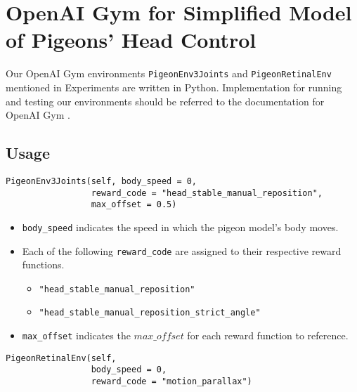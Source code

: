 \section{OpenAI Gym for Simplified Model of Pigeons' Head Control}
Our OpenAI Gym \cite{brockman2016openai} environments \lstinline|PigeonEnv3Joints| and \lstinline|PigeonRetinalEnv| mentioned in Experiments are written in Python. Implementation for running and testing our environments should be referred to the documentation for OpenAI Gym \cite{openai_2016}.

\subsection{Usage}
\begin{lstlisting}
PigeonEnv3Joints(self, body_speed = 0,
                 reward_code = "head_stable_manual_reposition",
                 max_offset = 0.5)
\end{lstlisting}
\begin{itemize}
    \item \lstinline|body_speed| indicates the speed in which the pigeon model's body moves.

    \item Each of the following \lstinline|reward_code| are assigned to their respective reward functions.
        \begin{itemize}
          \item \lstinline|"head_stable_manual_reposition"|
          \item \lstinline|"head_stable_manual_reposition_strict_angle"|
        \end{itemize}
    \item \lstinline|max_offset| indicates the $max\_offset$ for each reward function to reference.
\end{itemize}

\begin{lstlisting}
PigeonRetinalEnv(self,
                 body_speed = 0,
                 reward_code = "motion_parallax")
\end{lstlisting}

